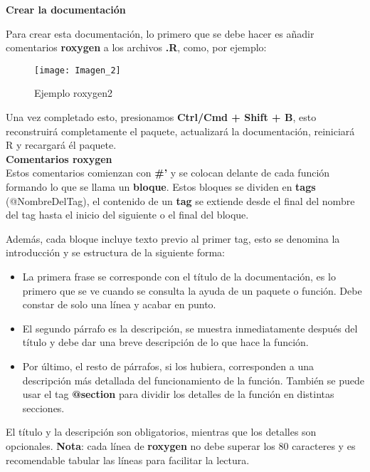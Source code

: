 \textbf{Crear la documentaci\'on}

Para crear esta documentaci\'on, lo primero que se debe hacer es a\~nadir comentarios
\textbf{roxygen} a los archivos \textbf{.R}, como, por ejemplo:

\begin{figure}[H]
    \centering
    \texttt{[image: Imagen\_2]}
    \caption{Ejemplo roxygen2   }
    \label{fig:roxygen2}
\end{figure} 

Una vez completado esto, presionamos \textbf{Ctrl/Cmd + Shift + B}, esto reconstruir\'a
completamente el paquete, actualizar\'a la documentaci\'on, reiniciar\'a R y recargar\'a \'el
paquete. \\

\textbf{Comentarios roxygen} \\
Estos comentarios comienzan con \textbf{\#'} y se colocan delante de cada funci\'on formando lo que
se llama un \textbf{bloque}. Estos bloques se dividen en \textbf{tags} (@NombreDelTag), el contenido de un
\textbf{tag} se extiende desde el final del nombre del tag hasta el inicio del siguiente o el final del
bloque.

Adem\'as, cada bloque incluye texto previo al primer tag, esto se denomina la introducci\'on y
se estructura de la siguiente forma:

\begin{itemize}
    \item La primera frase se corresponde con el t\'itulo de la documentaci\'on, es lo primero que
se ve cuando se consulta la ayuda de un paquete o funci\'on. Debe constar de solo
una l\'inea y acabar en punto.
    \item El segundo p\'arrafo es la descripci\'on, se muestra inmediatamente despu\'es del t\'itulo y
debe dar una breve descripci\'on de lo que hace la funci\'on.
    \item Por \'ultimo, el resto de p\'arrafos, si los hubiera, corresponden a una descripci\'on m\'as
detallada del funcionamiento de la funci\'on. Tambi\'en se puede usar el tag \textbf{@section}
para dividir los detalles de la funci\'on en distintas secciones.
\end{itemize}

El t\'itulo y la descripci\'on son obligatorios, mientras que los detalles son opcionales.
\textbf{Nota}: cada l\'inea de \textbf{roxygen} no debe superar los 80 caracteres y es recomendable tabular
las l\'ineas para facilitar la lectura.\\

